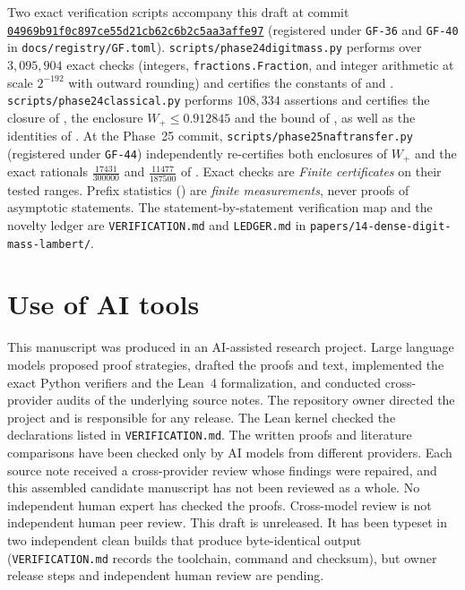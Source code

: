 \documentclass[11pt]{article}
\newcommand{\ttbreak}{\discretionary{}{}{}}
\newcommand{\ttt}[1]{\texttt{\begingroup\def\_{\textunderscore\ttbreak}#1\endgroup}}
\newcommand{\tpath}[1]{\nolinkurl{#1}}
\newcommand{\phaseXXIVcommit}{04969b91f0c897ce55d21cb62c6b2c5aa3affe97}
\newcommand{\commitref}[1]{\href{https://github.com/eldernos/MathematicsResearch/commit/#1}{\expandafter\nolinkurl\expandafter{#1}}}
\begin{document}
Two exact verification scripts accompany this draft at commit \commitref{\phaseXXIVcommit} (registered under \ttt{GF-36} and \ttt{GF-40} in \tpath{docs/registry/GF.toml}). \ttt{scripts/phase24\_digit\_mass.py} performs over $3{,}095{,}904$ exact checks (integers, \ttt{fractions.Fraction}, and integer arithmetic at scale $2^{-192}$ with outward rounding) and certifies the constants of  and . \ttt{scripts/phase24\_classical.py} performs $108{,}334$ assertions and certifies the closure of , the enclosure $W_+\le0.912845$ and the bound of , as well as the identities of . At the Phase~25 commit, \ttt{scripts/phase25\_naf\_transfer.py} (registered under \ttt{GF-44}) independently re-certifies both enclosures of $W_+$ and the exact rationals $\frac{17431}{300000}$ and $\frac{11477}{187500}$ of . Exact checks are \emph{Finite certificates} on their tested ranges. Prefix statistics () are \emph{finite measurements}, never proofs of asymptotic statements. The statement-by-statement verification map and the novelty ledger are \ttt{VERIFICATION.md} and \ttt{LEDGER.md} in \tpath{papers/14-dense-digit-mass-lambert/}.

\par\endgroup

\section{Use of AI tools}\label{sec:ai}

This manuscript was produced in an AI-assisted research project. Large language models proposed proof strategies, drafted the proofs and text, implemented the exact Python verifiers and the Lean~4 formalization, and conducted cross-provider audits of the underlying source notes. The repository owner directed the project and is responsible for any release. The Lean kernel checked the declarations listed in \ttt{VERIFICATION.md}. The written proofs and literature comparisons have been checked only by AI models from different providers. Each source note received a cross-provider review whose findings were repaired, and this assembled candidate manuscript has not been reviewed as a whole. No independent human expert has checked the proofs. Cross-model review is not independent human peer review. This draft is unreleased. It has been typeset in two independent clean builds that produce byte-identical output (\ttt{VERIFICATION.md} records the toolchain, command and checksum), but owner release steps and independent human review are pending.



\end{document}
